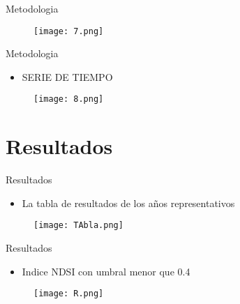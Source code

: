 \documentclass[handout,t]{beamer}
\begin{document}
\begin{frame}{Metodologia}
\begin{figure}
  \centering
  \texttt{[image: 7.png]}
\end{figure}
\end{frame}

\begin{frame}{Metodologia}
\begin{itemize}
    \item \small{SERIE DE TIEMPO}
    \end{itemize}
\begin{figure}
  \centering
  \texttt{[image: 8.png]}
\end{figure}
\end{frame}

\section{Resultados}
\begin{frame}{Resultados}
\begin{itemize}
    \item \small{La tabla de resultados de los años representativos}
    \end{itemize}
\begin{figure}
  \centering
  \texttt{[image: TAbla.png]}
\end{figure}
\end{frame}

\begin{frame}{Resultados}
\begin{itemize}
    \item \small{Indice NDSI con umbral menor que 0.4}
    \end{itemize}
\begin{figure}
  \centering
  \texttt{[image: R.png]}
\end{figure}
\end{frame}
\end{document}
